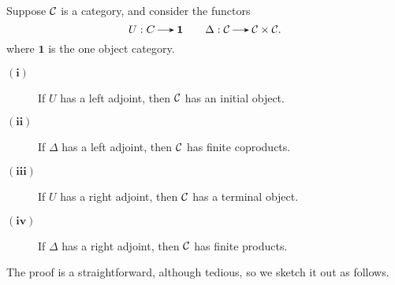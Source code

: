     \begin{proposition}
        Suppose $\mathcal{C}$ is a category, and consider the functors 
        \[
            U: C \to \textbf{1} \qquad \Delta: \cc \to \cc \times \cc.
        \]
        where $\textbf{1}$ is the one object category.
        \begin{description}
            \item[$\bm{(i)}$] If $U$ has a left adjoint, then 
            $\mathcal{C}$ has an initial object.   

            \item[$\bm{(ii)}$] If $\Delta$ has a left adjoint, then
            $\mathcal{C}$ has finite coproducts.

            \item[$\bm{(iii)}$] If $U$ has a right adjoint, then $\mathcal{C}$
            has a terminal object. 

            \item[$\bm{(iv)}$] If $\Delta$ has a right adjoint, then 
            $\mathcal{C}$ has finite products.  
        \end{description}
    \end{proposition}
    The proof is a straightforward, although tedious, so we sketch it
    out as follows. 

